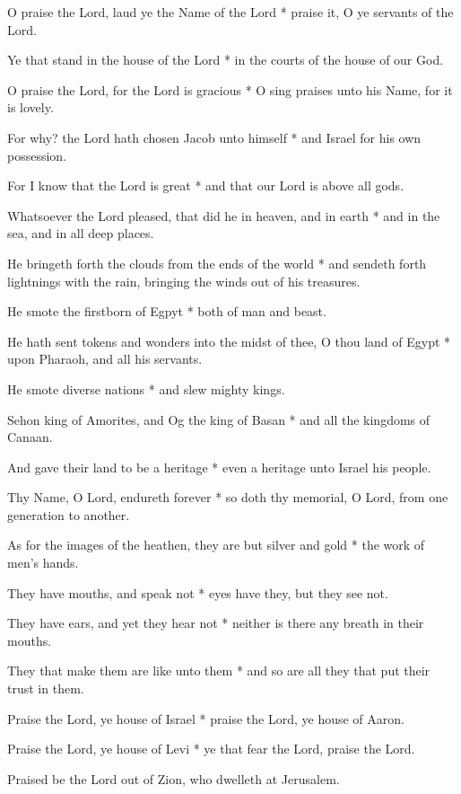 \begin{multicols}{2}
	
	O praise the Lord, laud ye the Name of the Lord * praise it, O ye servants of the Lord.
	
	Ye that stand in the house of the Lord * in the courts of the house of our God.
	
	O praise the Lord, for the Lord is gracious * O sing praises unto his Name, for it is lovely.
	
	For why? the Lord hath chosen Jacob unto himself * and Israel for his own possession.
	
	For I know that the Lord is great * and that our Lord is above all gods.
	
	Whatsoever the Lord pleased, that did he in heaven, and in earth * and in the sea, and in all deep places.
	
	He bringeth forth the clouds from the ends of the world * and sendeth forth lightnings with the rain, bringing the winds out of his treasures.
	
	He smote the firstborn of Egpyt * both of man and beast.
	
	He hath sent tokens and wonders into the midst of thee, O thou land of Egypt * upon Pharaoh, and all his servants.
	
	He smote diverse nations * and slew mighty kings.
	
	Sehon king of Amorites, and Og the king of Basan * and all the kingdoms of Canaan.
	
	And gave their land to be a heritage * even a heritage unto Israel his people.
	
	Thy Name, O Lord, endureth forever * so doth thy memorial, O Lord, from one generation to another.
	
	As for the images of the heathen, they are but silver and gold * the work of men's hands.
	
	They have mouths, and speak not * eyes have they, but they see not.
	
	They have ears, and yet they hear not * neither is there any breath in their mouths.
	
	They that make them are like unto them * and so are all they that put their trust in them.
	
	Praise the Lord, ye house of Israel * praise the Lord, ye house of Aaron.
	
	Praise the Lord, ye house of Levi * ye that fear the Lord, praise the Lord.
	
	Praised be the Lord out of Zion, who dwelleth at Jerusalem.
	
	\gloria{}
\end{multicols}